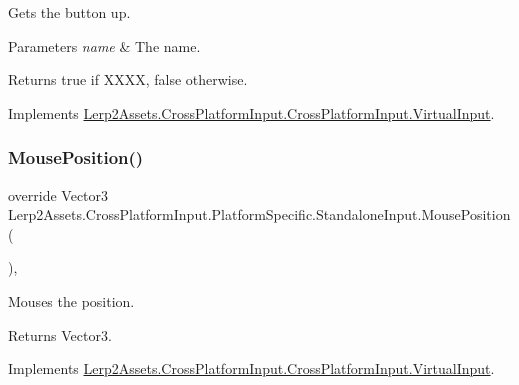 Gets the button up. 


\begin{DoxyParams}{Parameters}
{\em name} & The name.\\
\hline
\end{DoxyParams}
\begin{DoxyReturn}{Returns}
{\ttfamily true} if X\+X\+XX, {\ttfamily false} otherwise.
\end{DoxyReturn}


Implements \hyperlink{class_lerp2_assets_1_1_cross_platform_input_1_1_cross_platform_input_1_1_virtual_input_aab782d66a80ed30cd1234f1f218fb968}{Lerp2\+Assets.\+Cross\+Platform\+Input.\+Cross\+Platform\+Input.\+Virtual\+Input}.

\mbox{\label{class_lerp2_assets_1_1_cross_platform_input_1_1_platform_specific_1_1_standalone_input_a1ff080282b92ef258018a7df697f262a}} 
\subsubsection{\texorpdfstring{Mouse\+Position()}{MousePosition()}}
{\footnotesize\ttfamily override Vector3 Lerp2\+Assets.\+Cross\+Platform\+Input.\+Platform\+Specific.\+Standalone\+Input.\+Mouse\+Position (\begin{DoxyParamCaption}{ }\end{DoxyParamCaption})\hspace{0.3cm}{\ttfamily [inline]}, {\ttfamily [virtual]}}



Mouses the position. 

\begin{DoxyReturn}{Returns}
Vector3.
\end{DoxyReturn}


Implements \hyperlink{class_lerp2_assets_1_1_cross_platform_input_1_1_cross_platform_input_1_1_virtual_input_a76252149fde904955d20431d19daced8}{Lerp2\+Assets.\+Cross\+Platform\+Input.\+Cross\+Platform\+Input.\+Virtual\+Input}.

